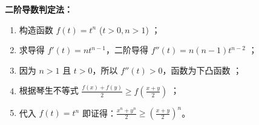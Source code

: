 \begin{proofbox}
\textbf{二阶导数判定法：}
\begin{enumerate}
    \item 构造函数 $f(t) = t^n$ ($t > 0, n > 1$) ；
    \item 求导得 $f'(t) = nt^{n-1}$，二阶导得 $f''(t) = n(n-1)t^{n-2}$ ；
    \item 因为 $n > 1$ 且 $t > 0$，所以 $f''(t) > 0$，函数为下凸函数 ；
    \item 根据琴生不等式 $\frac{f(x)+f(y)}{2} \geqslant f\left(\frac{x+y}{2}\right)$ ；
    \item 代入 $f(t) = t^n$ 即证得：$\frac{x^n + y^n}{2} \geqslant \left(\frac{x+y}{2}\right)^n$。
\end{enumerate}
\end{proofbox}